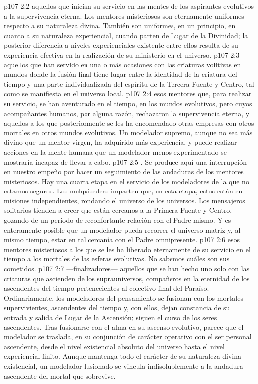 \vs p107 2:2  aquellos que inician su servicio en las mentes de los aspirantes evolutivos a la supervivencia eterna. Los mentores misteriosos son eternamente uniformes respecto a su naturaleza divina. También son uniformes, en un principio, en cuanto a su naturaleza experiencial, cuando parten de Lugar de la Divinidad; la posterior diferencia a niveles experienciales existente entre ellos resulta de su experiencia efectiva en la realización de su ministerio en el universo.
\vs p107 2:3  aquellos que han servido en una o más ocasiones con las criaturas volitivas en mundos donde la fusión final tiene lugar entre la identidad de la criatura del tiempo y una parte individualizada del espíritu de la Tercera Fuente y Centro, tal como se manifiesta en el universo local.
\vs p107 2:4  esos mentores que, para realizar su servicio, se han aventurado en el tiempo, en los mundos evolutivos, pero cuyos acompañantes humanos, por alguna razón, rechazaron la supervivencia eterna, y aquellos a los que posteriormente se les ha encomendado otras empresas con otros mortales en otros mundos evolutivos. Un modelador supremo, aunque no sea más divino que un mentor virgen, ha adquirido más experiencia, y puede realizar acciones en la mente humana que un modelador menos experimentado se mostraría incapaz de llevar a cabo.
\vs p107 2:5 . Se produce aquí una interrupción en nuestro empeño por hacer un seguimiento de las andaduras de los mentores misteriosos. Hay una cuarta etapa en el servicio de los modeladores de la que no estamos seguros. Los melquisedecs imparten que, en esta etapa, estos están en misiones independientes, rondando el universo de los universos. Los mensajeros solitarios tienden a creer que están cercanos a la Primera Fuente y Centro, gozando de un período de reconfortante relación con el Padre mismo. Y es enteramente posible que un modelador pueda recorrer el universo matriz y, al mismo tiempo, estar en tal cercanía con el Padre omnipresente.
\vs p107 2:6  esos mentores misteriosos a los que se les ha liberado eternamente de su servicio en el tiempo a los mortales de las esferas evolutivas. No sabemos cuáles son sus cometidos.
\vs p107 2:7  ---finalizadores--- aquellos que se han hecho uno solo con las criaturas que ascienden de los suprauniversos, compañeros en la eternidad de los ascendentes del tiempo pertenecientes al colectivo final del Paraíso. Ordinariamente, los modeladores del pensamiento se fusionan con los mortales supervivientes, ascendentes del tiempo y, con ellos, dejan constancia de su entrada y salida de Lugar de la Ascensión; siguen el curso de los seres ascendentes. Tras fusionarse con el alma en su ascenso evolutivo, parece que el modelador se traslada, en su conjunción de carácter operativo con el ser personal ascendente, desde el nivel existencial absoluto del universo hasta el nivel experiencial finito. Aunque mantenga todo el carácter de su naturaleza divina existencial, un modelador fusionado se vincula indisolublemente a la andadura ascendente del mortal que sobrevive.
